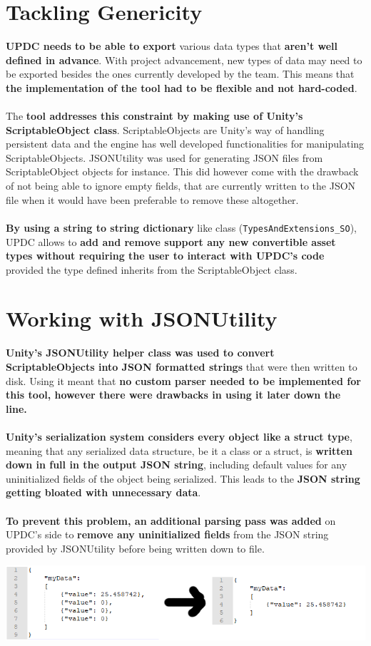 \documentclass[12pt,a4paper]{article}
\begin{document}
\section{Tackling Genericity}
\textbf{UPDC needs to be able to export} various data types that \textbf{aren't well defined in advance}. With project advancement, new types of data may need to be exported besides the ones currently developed by the team. This means that \textbf{the implementation of the tool had to be flexible and not hard-coded}.\\\\
The \textbf{tool addresses this constraint by making use of Unity's ScriptableObject class}. ScriptableObjects are Unity's way of handling persistent data and the engine has well developed functionalities for manipulating ScriptableObjects. JSONUtility was used for generating JSON files from ScriptableObject objects for instance. This did however come with the drawback of not being able to ignore empty fields, that are currently written to the JSON file when it would have been preferable to remove these altogether.\\\\
\textbf{By using a string to string dictionary} like class (\texttt{TypesAndExtensions\_SO}), UPDC allows to \textbf{add and remove support any new convertible asset types without requiring the user to interact with UPDC's code} provided the type defined inherits from the ScriptableObject class.

\section{Working with JSONUtility}
\textbf{Unity's JSONUtility helper class was used to convert ScriptableObjects into JSON formatted strings} that were then written to disk. Using it meant that \textbf{no custom parser needed to be implemented for this tool, however there were drawbacks in using it later down the line.}\\\\
\textbf{Unity's serialization system considers every object like a struct type}, meaning that any serialized data structure, be it a class or a struct, is \textbf{written down in full in the output JSON string}, including default values for any uninitialized fields of the object being serialized. This leads to the \textbf{JSON string getting bloated with unnecessary data}.\\\\
\textbf{To prevent this problem, an additional parsing pass was added} on UPDC's side to \textbf{remove any uninitialized fields} from the JSON string provided by JSONUtility before being written down to file.
\begin{center}
\includegraphics[scale=1.0]{cleaningJson}
\end{center}
\end{document}
